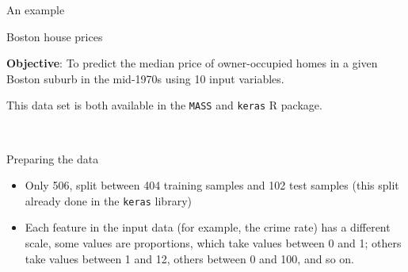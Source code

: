 \documentclass[10pt,ignorenonframetext,]{beamer}
\providecommand{\tightlist}{%
  \setlength{\itemsep}{0pt}\setlength{\parskip}{0pt}}
\begin{document}
\begin{frame}[fragile]{An example}
\protect\hypertarget{an-example}{}

\begin{block}{Boston house prices}

\textbf{Objective}: To predict the median price of owner-occupied homes
in a given Boston suburb in the mid-1970s using 10 input variables.

This data set is both available in the \texttt{MASS} and \texttt{keras}
R package.

\(~\)

\begin{block}{Preparing the data}

\begin{itemize}
\tightlist
\item
  Only 506, split between 404 training samples and 102 test samples
  (this split already done in the \texttt{keras} library)
\item
  Each feature in the input data (for example, the crime rate) has a
  different scale, some values are proportions, which take values
  between 0 and 1; others take values between 1 and 12, others between 0
  and 100, and so on.
\end{itemize}

\end{block}

\end{block}

\end{frame}
\end{document}
